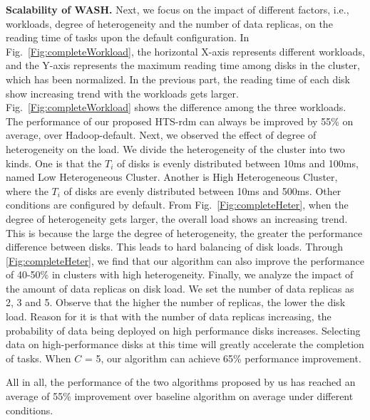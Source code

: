 \documentclass[conference]{IEEEtran}
\begin{document}
\textbf{Scalability of WASH.} Next, we focus on the impact of different factors, i.e., workloads, degree of heterogeneity and the number of data replicas, on the reading time of tasks upon the default configuration. In Fig.~\ref{Fig:completeWorkload}, the horizontal X-axis represents different workloads, and the Y-axis represents the maximum reading time among disks in the cluster, which has been normalized. In the previous part, the reading time of each disk show increasing trend with the workloads gets larger. 
Fig.~\ref{Fig:completeWorkload} shows the difference among the three workloads. The performance of our proposed HTS-rdm can always be improved by 55\% on average, over Hadoop-default. Next, we observed the effect of degree of heterogeneity on the load. We divide the heterogeneity of the cluster into two kinds. One is that the $T_i$ of disks is evenly distributed between 10ms and 100ms, named Low Heterogeneous Cluster. Another is High Heterogeneous Cluster, where the $T_i$ of disks are evenly distributed between 10ms and 500ms. Other conditions are configured by default. From Fig.~\ref{Fig:completeHeter}, when the degree of heterogeneity gets larger, the overall load shows an increasing trend. This is because the large the degree of heterogeneity, the greater the performance difference between disks. This leads to hard balancing of disk loads. Through \ref{Fig:completeHeter}, we find that our algorithm can also improve the performance of 40-50\% in clusters with high heterogeneity. Finally, we analyze the impact of the amount of data replicas on disk load. We set the number of data replicas as 2, 3 and 5. Observe that the higher the number of replicas, the lower the disk load. Reason for it is that with the number of data replicas increasing, the probability of data being deployed on high performance disks increases. Selecting data on high-performance disks at this time will greatly accelerate the completion of tasks. When $C$ = 5, our algorithm can achieve 65\% performance improvement.
 
 All in all,  the performance of the two algorithms proposed by us has reached an average of 55\% improvement over baseline algorithm on average under different conditions.
\end{document}
